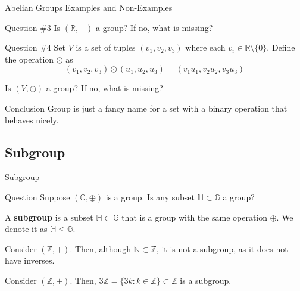 \documentclass{beamer}
\begin{document}
    \begin{frame}{Abelian Groups Examples and Non-Examples}
      \begin{alertblock}{Question \#3}
        Is $(\mathbb{R}, -)$ a group? If no, what is missing?
      \end{alertblock}
      \pause

      \begin{alertblock}{Question \#4}
          Set $V$ is a set of tuples $(v_1,v_2,v_3)$ where each $v_i \in \mathbb{R} \setminus \{0\}$. Define the operation $\odot$ as
          \begin{equation*}
              (v_1,v_2,v_3) \odot (u_1,u_2,u_3) = (v_1u_1, v_2u_2, v_3u_3)
          \end{equation*}

          Is $(V, \odot)$ a group? If no, what is missing?
      \end{alertblock}
      \pause

      \begin{block}{Conclusion}
        Group is just a fancy name for a set with a binary operation that behaves nicely.
      \end{block}
    \end{frame}

    \subsection{Subgroup}
    \begin{frame}{Subgroup}

      \begin{alertblock}{Question}
          Suppose $(\mathbb{G}, \oplus)$ is a group. Is any subset $\mathbb{H} \subset \mathbb{G}$ a group?
      \end{alertblock}
      \pause

      \begin{definition}
          A \textbf{subgroup} is a subset $\mathbb{H} \subset \mathbb{G}$ that is a group with the same operation $\oplus$. We denote it as $\mathbb{H} \leq \mathbb{G}$.
      \end{definition}
      \pause

      \begin{example}
          Consider $(\mathbb{Z}, +)$. Then, although $\mathbb{N} \subset \mathbb{Z}$, it is not a subgroup, as it does not have inverses.
      \end{example}
      \pause

      \begin{example}
          Consider $(\mathbb{Z}, +)$. Then, $3\mathbb{Z} = \{3k: k \in \mathbb{Z}\} \subset \mathbb{Z}$ is a subgroup.
      \end{example}
  \end{frame}
\end{document}
